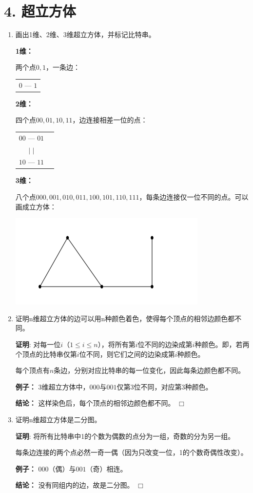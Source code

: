 \documentclass[11pt]{article}
\newenvironment{qparts}{\begin{enumerate}[{(}a{)}]}{\end{enumerate}}
\def\endproofmark{$\Box$}
\newenvironment{proof}{\par{\bf 证明}:}{\endproofmark\smallskip}
\begin{document}
\section*{4. 超立方体}
\begin{qparts}
\item 画出1维、2维、3维超立方体，并标记比特串。

\textbf{1维：}

两个点$0,1$，一条边：

\begin{center}
\begin{tabular}{c}
$0$ --- $1$
\end{tabular}
\end{center}

\textbf{2维：}

四个点$00,01,10,11$，边连接相差一位的点：

\begin{center}
\begin{tabular}{cc}
$00$ --- $01$ \\
$|$ \hspace{1.5cm} $|$ \\
$10$ --- $11$
\end{tabular}
\end{center}

\textbf{3维：}

八个点$000,001,010,011,100,101,110,111$，每条边连接仅一位不同的点。可以画成立方体：

\begin{center}
\includegraphics[width=0.3\linewidth]{week2/image-1.png}
\end{center}

\item 证明n维超立方体的边可以用n种颜色着色，使得每个顶点的相邻边颜色都不同。
\begin{proof}
对每一位$i$（$1 \leq i \leq n$），将所有第$i$位不同的边染成第$i$种颜色。即，若两个顶点的比特串仅第$i$位不同，则它们之间的边染成第$i$种颜色。

每个顶点有$n$条边，分别对应比特串的每一位变化，因此每条边颜色都不同。

\textbf{例子：} 3维超立方体中，$000$与$001$仅第3位不同，对应第3种颜色。

\textbf{结论：} 这样染色后，每个顶点的相邻边颜色都不同。
\end{proof}

\item 证明n维超立方体是二分图。
\begin{proof}
将所有比特串中1的个数为偶数的点分为一组，奇数的分为另一组。

每条边连接的两个点必然一奇一偶（因为只改变一位，1的个数奇偶性改变）。

\textbf{例子：} $000$（偶）与$001$（奇）相连。

\textbf{结论：} 没有同组内的边，故是二分图。
\end{proof}
\end{qparts}
\end{document}

